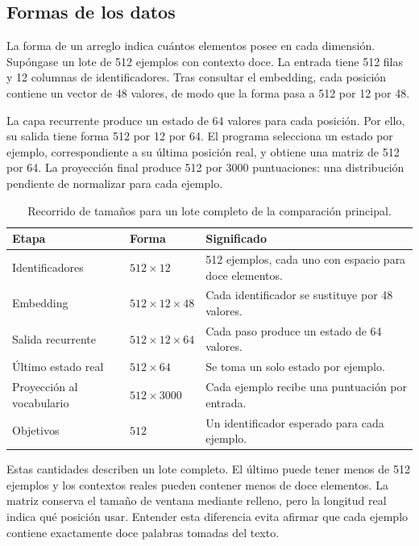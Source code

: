 \subsection{Formas de los datos}
La forma de un arreglo indica cuántos elementos posee en cada dimensión. Supóngase un lote de 512 ejemplos con contexto doce. La entrada tiene 512 filas y 12 columnas de identificadores. Tras consultar el embedding, cada posición contiene un vector de 48 valores, de modo que la forma pasa a 512 por 12 por 48.

La capa recurrente produce un estado de 64 valores para cada posición. Por ello, su salida tiene forma 512 por 12 por 64. El programa selecciona un estado por ejemplo, correspondiente a su última posición real, y obtiene una matriz de 512 por 64. La proyección final produce 512 por 3000 puntuaciones: una distribución pendiente de normalizar para cada ejemplo.

\begin{table}[tb]
\caption{Recorrido de tamaños para un lote completo de la comparación principal.}
\centering
\begin{tabular}{p{}p{}p{}}
\toprule Etapa & Forma & Significado\\\midrule
Identificadores & $512\times12$ & 512 ejemplos, cada uno con espacio para doce elementos.\\
Embedding & $512\times12\times48$ & Cada identificador se sustituye por 48 valores.\\
Salida recurrente & $512\times12\times64$ & Cada paso produce un estado de 64 valores.\\
Último estado real & $512\times64$ & Se toma un solo estado por ejemplo.\\
Proyección al vocabulario & $512\times3000$ & Cada ejemplo recibe una puntuación por entrada.\\
Objetivos & $512$ & Un identificador esperado para cada ejemplo.\\\bottomrule
\end{tabular}
\end{table}

Estas cantidades describen un lote completo. El último puede tener menos de 512 ejemplos y los contextos reales pueden contener menos de doce elementos. La matriz conserva el tamaño de ventana mediante relleno, pero la longitud real indica qué posición usar. Entender esta diferencia evita afirmar que cada ejemplo contiene exactamente doce palabras tomadas del texto.


